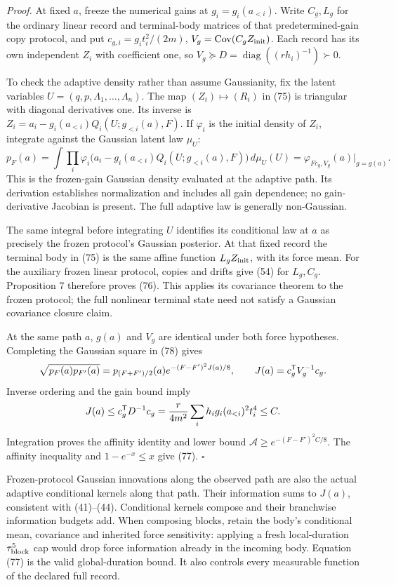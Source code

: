 \documentclass[11pt,a4paper]{article}
\begin{document}
\emph{Proof.} At fixed \(a\), freeze the numerical gains at
\(g_i=g_i(a_{<i})\). Write \(C_g,L_g\) for the ordinary linear record
and terminal-body matrices of that predetermined-gain copy protocol, and
put \(c_{g,i}=g_it_i^2/(2m)\),
\(V_g=\operatorname{Cov}(C_gZ_{\rm init})\). Each record has its own
independent \(Z_i\) with coefficient one, so
\(V_g\succeq D=\operatorname{diag}((rh_i)^{-1})\succ0\).

To check the adaptive density rather than assume Gaussianity, fix the
latent variables \(U=(q,p,\Lambda_1,\ldots,\Lambda_n)\). The map
\((Z_i)\mapsto(R_i)\) in (75) is triangular with diagonal derivatives
one. Its inverse is \(Z_i=a_i-g_i(a_{<i})Q_i(U;g_{<i}(a),F)\). If
\(\varphi_i\) is the initial density of \(Z_i\), integrate against the
Gaussian latent law \(\mu_U\): \[p_F(a)=\int\prod_i
 \varphi_i\bigl(a_i-g_i(a_{<i})Q_i(U;g_{<i}(a),F)\bigr)
 \,d\mu_U(U)
=\varphi_{Fc_g,V_g}(a)\big|_{g=g(a)}.\tag{78}\] This is the frozen-gain
Gaussian density evaluated at the adaptive path. Its derivation
establishes normalization and includes all gain dependence; no
gain-derivative Jacobian is present. The full adaptive law is generally
non-Gaussian.

The same integral before integrating \(U\) identifies its conditional
law at \(a\) as precisely the frozen protocol's Gaussian posterior. At
that fixed record the terminal body in (75) is the same affine function
\(L_gZ_{\rm init}\), with its force mean. For the auxiliary frozen
linear protocol, copies and drifts give (54) for \(L_g,C_g\).
Proposition 7 therefore proves (76). This applies its covariance theorem
to the frozen protocol; the full nonlinear terminal state need not
satisfy a Gaussian covariance closure claim.

At the same path \(a\), \(g(a)\) and \(V_g\) are identical under both
force hypotheses. Completing the Gaussian square in (78) gives
\[\sqrt{p_F(a)p_{F'}(a)}
=p_{(F+F')/2}(a)
           e^{-(F-F')^2J(a)/8},\qquad
J(a)=c_g^{\sf T}V_g^{-1}c_g.\] Inverse ordering and the gain bound imply
\[J(a)\le c_g^{\sf T}D^{-1}c_g
=\frac r{4m^2}\sum_i h_ig_i(a_{<i})^2t_i^4
\le C.\] Integration proves the affinity identity and lower bound
\(\mathcal A\ge e^{-(F-F')^2C/8}\). The affinity inequality and
\(1-e^{-x}\le x\) give (77). \(\square\)

Frozen-protocol Gaussian innovations along the observed path are also
the actual adaptive conditional kernels along that path. Their
information sums to \(J(a)\), consistent with (41)--(44). Conditional
kernels compose and their branchwise information budgets add. When
composing blocks, retain the body's conditional mean, covariance and
inherited force sensitivity: applying a fresh local-duration
\(\tau_{\rm block}^5\) cap would drop force information already in the
incoming body. Equation (77) is the valid global-duration bound. It also
controls every measurable function of the declared full record.
\end{document}

